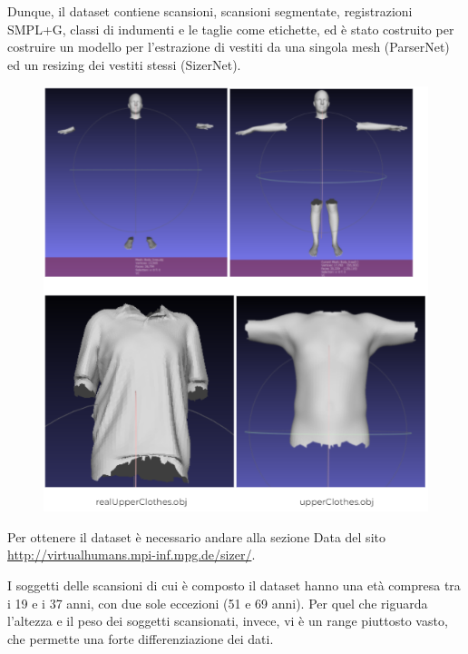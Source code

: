 \medskip

Dunque, il dataset contiene scansioni, scansioni segmentate, registrazioni SMPL+G, classi di indumenti e le taglie come etichette, ed è stato costruito per costruire un modello per l’estrazione di vestiti da una singola mesh (ParserNet) ed un resizing dei vestiti stessi (SizerNet).

\newpage

\begin{figure}[ht!]
  \centering
  \includegraphics[scale=0.9]{Images/SizerPic/Sizer1.5.png}
    \label{fig:Sizer1.5}
\end{figure}

\medskip

Per ottenere il dataset è necessario andare alla sezione Data del sito \url{http://virtualhumans.mpi-inf.mpg.de/sizer/}.

\medskip

I soggetti delle scansioni di cui è composto il dataset hanno una età compresa tra i 19 e i 37 anni, con due sole eccezioni (51 e 69 anni). Per quel che riguarda l’altezza e il peso dei soggetti scansionati, invece, vi è un range piuttosto vasto, che permette una forte differenziazione dei dati.

